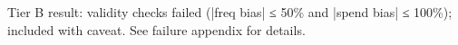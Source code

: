 \begin{tablenotes}\small
\item[†] Tier B result: validity checks failed (|freq bias| ≤ 50\% and |spend bias| ≤ 100\%); included with caveat. See failure appendix for details.
\end{tablenotes}
